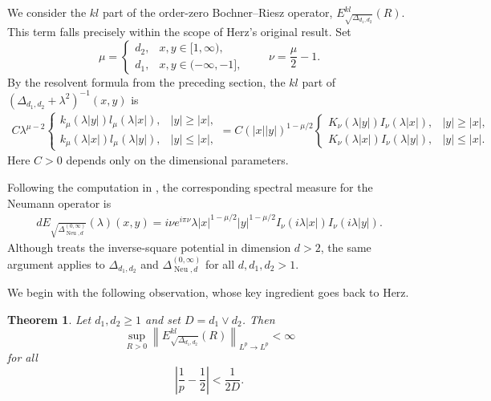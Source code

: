 \documentclass[12pt]{amsart}
\newcommand\Neu{\operatorname{Neu}}
\newcommand\LapoN{\Delta^{(0, \infty)}_{\Neu, d}}
\newcommand\Lapd{\Delta_{d_1, d_2}}
\newtheorem{theorem}{Theorem}[section]
\begin{document}
We consider the $kl$ part of the order-zero Bochner--Riesz operator,
$E_{\sqrt{\Lapd}}^{kl}(R)$. This term falls precisely within the scope of
Herz's original result. Set
\begin{equation}
    \mu =
    \begin{cases}
        d_2, & x,y\in [1,\infty),\\
        d_1, & x,y\in (-\infty,-1],
    \end{cases}
    \qquad
    \nu=\frac{\mu}{2}-1.
\end{equation}
By the resolvent formula from the preceding section, the $kl$ part of
$(\Lapd+\lambda^2)^{-1}(x,y)$ is
\begin{align*}
    C\lambda^{\mu-2}
    \begin{cases}
        k_{\mu}(\lambda |y|)l_{\mu}(\lambda |x|), & |y|\ge |x|,\\
        k_{\mu}(\lambda |x|)l_{\mu}(\lambda |y|), & |y|\le |x|,
    \end{cases}
    =
    C(|x||y|)^{1-\mu/2}
    \begin{cases}
        K_{\nu}(\lambda |y|)I_{\nu}(\lambda |x|), & |y|\ge |x|,\\
        K_{\nu}(\lambda |x|)I_{\nu}(\lambda |y|), & |y|\le |x|.
    \end{cases}
\end{align*}
Here $C>0$ depends only on the dimensional parameters.

Following the computation in \cite[III.4.4]{COSY}, the corresponding
spectral measure for the Neumann operator is
\begin{align}\label{spectral_measure}
    dE_{\sqrt{\LapoN}}(\lambda)(x,y)
    =
    i\nu e^{i\pi\nu}\lambda
    |x|^{1-\mu/2}|y|^{1-\mu/2}
    I_{\nu}(i\lambda |x|)I_{\nu}(i\lambda |y|).
\end{align}
Although \cite{COSY} treats the inverse-square potential in dimension
$d>2$, the same argument applies to $\Lapd$ and $\LapoN$ for all
$d,d_1,d_2>1$.





We begin with the following observation, whose key ingredient goes back to Herz.

\begin{theorem}\label{herz_kl}
Let $d_1,d_2\ge 1$ and set $D=d_1\vee d_2$. Then
\[
    \sup_{R>0}\left\|E_{\sqrt{\Lapd}}^{kl}(R)\right\|_{L^p\to L^p}
    <\infty
\]
for all
\[
    \left|\frac{1}{p}-\frac{1}{2}\right|<\frac{1}{2D}.
\]
\end{theorem}
\end{document}
